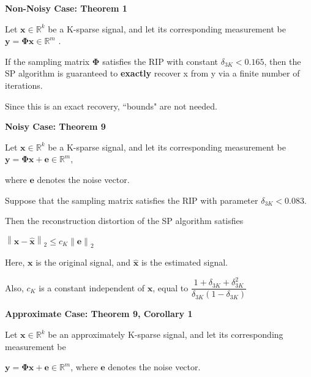 \documentclass[fleqn, 11pt]{article}
\newcommand{\bs}[1]{\boldsymbol{#1}}
\newcommand\norm[1]{\left\lVert#1\right\rVert}
\newcommand{\R}[0]{\mathbb{R}}
\begin{document}
\medskip

\textbf{Non-Noisy Case: Theorem 1 }

\smallskip

Let $\bs{x} \in \R^k$ be a K-sparse signal, and let
its corresponding measurement be $\bs{y = \Phi x} \in \R^m$ .

\smallskip

If the sampling matrix $\bs{\Phi}$  satisfies the RIP with constant  $\delta_{3K} < 0.165$, then the SP algorithm is guaranteed to \textbf{exactly} recover x from
y via a finite number of iterations.

\smallskip


Since this is an exact recovery, ``bounds" are not needed. 


\hrulefill

\medskip

\textbf{Noisy Case: Theorem 9 }

\smallskip

Let $\bs{x} \in \R^k$ be a K-sparse signal, and let
its corresponding measurement be $\bs{y = \Phi x + e}  \in \R^m$, 

where $\bs{e}$  denotes the noise vector. 

\smallskip

Suppose that the sampling matrix satisfies
the RIP with parameter $\delta_{3K} < 0.083 $.  

\smallskip

Then the reconstruction distortion of the SP algorithm satisfies
\begin{center}
    $\norm{\bs{x - \hat{x}}}_2 \leq c_K \norm{\bs{e}}_2$
\end{center}

Here, $\bs{x}$ is the original signal, and $\bs{\hat{x}}$ is the estimated signal. 

\smallskip

Also, $c_K$ is a constant independent of $\bs{x}$, equal to $\dfrac{1+\delta_{3K}+\delta_{3K}^2}{\delta_{3K}(1-\delta_{3K})}$

\smallskip

\hrulefill

\medskip


\textbf{Approximate Case: Theorem 9, Corollary 1} 

\smallskip

Let $\bs{x} \in \R^k$ be an approximately K-sparse signal, and let
its corresponding measurement be 

$\bs{y = \Phi x + e}  \in \R^m$, where $\bs{e}$  denotes the noise vector.
\end{document}
